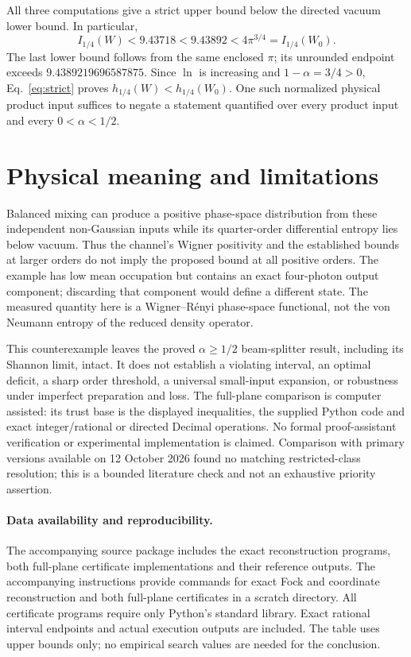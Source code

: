 \documentclass[11pt]{article}
\begin{document}
All three computations give a strict upper bound below the directed
vacuum lower bound. In particular,
\begin{equation}
 I_{1/4}(W)<9.43718<9.43892<4\pi^{3/4}
          =I_{1/4}(W_0).
 \label{eq:strict}
\end{equation}
The last lower bound follows from the same enclosed $\pi$; its unrounded
endpoint exceeds $9.4389219696587875$.
Since $\ln$ is increasing and $1-\alpha=3/4>0$,
Eq.~\eqref{eq:strict} proves $h_{1/4}(W)<h_{1/4}(W_0)$.
One such normalized physical product input suffices to negate a statement
quantified over every product input and every $0<\alpha<1/2$.

\section{Physical meaning and limitations}
Balanced mixing can produce a positive phase-space distribution from these
independent non-Gaussian inputs while its quarter-order differential entropy
lies below vacuum. Thus the channel's Wigner positivity and the established
bounds at larger orders do not imply the proposed bound at all positive orders.
The example has low mean occupation but contains an exact four-photon
output component; discarding that component would define a different state.
The measured quantity here is a Wigner--R\'enyi phase-space functional, not
the von Neumann entropy of the reduced density operator.

This counterexample leaves the proved $\alpha\geq1/2$ beam-splitter result,
including its Shannon limit, intact. It does not establish a violating
interval, an optimal deficit, a sharp order threshold, a universal small-input
expansion, or robustness under imperfect preparation and loss.
The full-plane comparison is computer assisted: its trust base is the
displayed inequalities, the supplied Python code and exact integer/rational
or directed Decimal operations. No formal proof-assistant verification or
experimental implementation is claimed.
Comparison with primary versions available on 12 October 2026 found no
matching restricted-class resolution; this is a bounded literature check
and not an exhaustive priority assertion.

\paragraph{Data availability and reproducibility.}
The accompanying source package includes the exact reconstruction programs,
both full-plane certificate implementations and their reference outputs.
The accompanying instructions provide commands for exact Fock
and coordinate reconstruction and both full-plane certificates in a scratch
directory.
All certificate programs require only Python's standard library.
Exact rational interval endpoints and actual execution outputs are included.
The table uses upper bounds only; no empirical search values are needed
for the conclusion.
\end{document}
